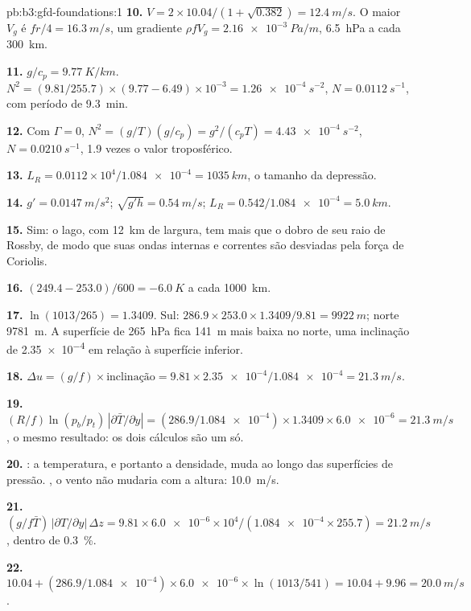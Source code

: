 \begin{solution}{pb:b3:gfd-foundations:1}
\textbf{10.} $V = 2\times10.04/(1 + \sqrt{0.382}) = \qty{12.4}{m/s}$. O
maior $V_g$ é $fr/4 = \qty{16.3}{m/s}$, um gradiente $\rho fV_g =
\qty{2.16e-3}{Pa/m}$, \qty{6.5}{hPa} a cada \qty{300}{km}.

\textbf{11.} $g/c_p = \qty{9.77}{K/km}$. $N^2 = (9.81/255.7)\times(9.77 -
6.49)\times10^{-3} = \qty{1.26e-4}{s^{-2}}$, $N = \qty{0.0112}{s^{-1}}$, com
período de \qty{9.3}{min}.

\textbf{12.} Com $\Gamma = 0$, $N^2 = (g/T)(g/c_p) = g^2/(c_pT) =
\qty{4.43e-4}{s^{-2}}$, $N = \qty{0.0210}{s^{-1}}$, 1.9 vezes o
valor troposférico.

\textbf{13.} $L_R = 0.0112\times10^4/\num{1.084e-4} = \qty{1035}{km}$, o
tamanho da depressão.

\textbf{14.} $g' = \qty{0.0147}{m/s^2}$; $\sqrt{g'h} = \qty{0.54}{m/s}$;
$L_R = 0.542/\num{1.084e-4} = \qty{5.0}{km}$.

\textbf{15.} Sim: o lago, com \qty{12}{km} de largura, tem mais que o dobro
de seu raio de Rossby, de modo que suas ondas internas e correntes são
desviadas pela força de Coriolis.

\textbf{16.} $(249.4 - 253.0)/600 = \qty{-6.0}{K}$ a cada \qty{1000}{km}.

\textbf{17.} $\ln(1013/265) = 1.3409$. Sul:
$286.9\times253.0\times1.3409/9.81 = \qty{9922}{m}$; norte \qty{9781}{m}.
A superfície de \qty{265}{hPa} fica \qty{141}{m} mais baixa no norte, uma
inclinação de \num{2.35e-4} em relação à superfície inferior.

\textbf{18.} $\Delta u = (g/f)\times\text{inclinação} = 9.81\times\num{2.35e-4}/
\num{1.084e-4} = \qty{21.3}{m/s}$.

\textbf{19.} $(R/f)\ln(p_b/p_t)\,|\partial\bar T/\partial y| =
(286.9/\num{1.084e-4})\times1.3409\times\num{6.0e-6} = \qty{21.3}{m/s}$, o
mesmo resultado: os dois cálculos são um só.

\textbf{20.} : a temperatura, e portanto a densidade, muda ao
longo das superfícies de pressão. , o vento não mudaria com a
altura: \qty{10.0}{m/s}.

\textbf{21.} $(g/f\bar T)\,|\partial T/\partial y|\,\Delta z = 9.81\times
\num{6.0e-6}\times10^4/(\num{1.084e-4}\times255.7) = \qty{21.2}{m/s}$,
dentro de \qty{0.3}{\percent}.

\textbf{22.} $10.04 + (286.9/\num{1.084e-4})\times\num{6.0e-6}\times
\ln(1013/541) = 10.04 + 9.96 = \qty{20.0}{m/s}$.


\end{solution}

